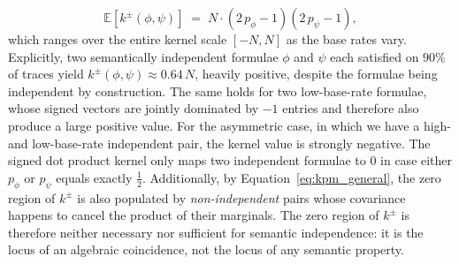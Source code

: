 \documentclass[titlepage,a4paper,11pt]{report}
\begin{document}
    \begin{equation}\label{eq:kpm_indep}
        \mathbb{E}\!\left[k^\pm(\phi, \psi)\right]
        \;=\;
        N \cdot (2\,p_\phi - 1)(2\,p_\psi - 1),
    \end{equation}
    which ranges over the entire kernel scale $[-N, N]$ as the base rates vary. Explicitly, two semantically independent formulae $\phi$ and $\psi$ each satisfied on $90\%$ of traces yield $k^\pm(\phi,\psi) \approx 0.64\,N$, heavily positive, despite the formulae being independent by construction. The same holds for two low-base-rate formulae, whose signed vectors are jointly dominated by $-1$ entries and therefore also produce a large positive value. For the asymmetric case, in which we have a high- and low-base-rate independent pair, the kernel value is strongly negative. The signed dot product kernel only maps two independent formulae to $0$ in case either $p_\phi$ or $p_\psi$ equals exactly $\tfrac{1}{2}$. Additionally, by Equation~\eqref{eq:kpm_general}, the zero region of $k^\pm$ is also populated by \emph{non-independent} pairs whose covariance happens to cancel the product of their marginals. The zero region of $k^\pm$ is therefore neither necessary nor sufficient for semantic independence: it is the locus of an algebraic coincidence, not the locus of any semantic property.
\end{document}
